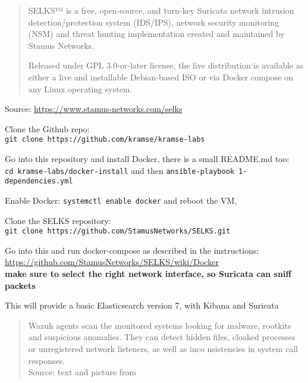 \documentclass[Screen16to9,17pt]{foils}
\begin{document}


\begin{quote}
SELKS™ is a free, open-source, and turn-key Suricata network intrusion detection/protection system (IDS/IPS), network security monitoring (NSM) and threat hunting implementation created and maintained by Stamus Networks.

Released under GPL 3.0-or-later license, the live distribution is available as either a live and installable Debian-based ISO or via Docker compose on any Linux operating system.
\end{quote}
Source: \url{https://www.stamus-networks.com/selks}



\begin{list1}
\item[\faSquareO] Clone the Github repo: \\
\verb+git clone https://github.com/kramse/kramse-labs+
\item[\faSquareO] Go into this repository and install Docker, there is a small README.md too:\\
\verb+cd kramse-labs/docker-install+ and then \verb+ansible-playbook 1-dependencies.yml+
\item[\faSquareO] Enable Docker: \verb+systemctl enable docker+ and reboot the VM,
\item[\faSquareO] Clone the SELKS repository:\\
\verb+git clone https://github.com/StamusNetworks/SELKS.git+
\item[\faSquareO] Go into this and run docker-compose as described in the instructions:\\
\url{https://github.com/StamusNetworks/SELKS/wiki/Docker}\\
{\bf  make sure to select the right network interface, so Suricata can sniff packets}
\end{list1}

This will provide a basic Elasticsearch version 7, with Kibana and Suricata



\begin{quote}\small
Wazuh agents scan the monitored systems looking for malware, rootkits and suspicious anomalies. They can detect hidden files, cloaked processes or unregistered network listeners, as well as inco
nsistencies in system call responses.\\
Source: text and picture from 
\end{quote}
\end{document}

